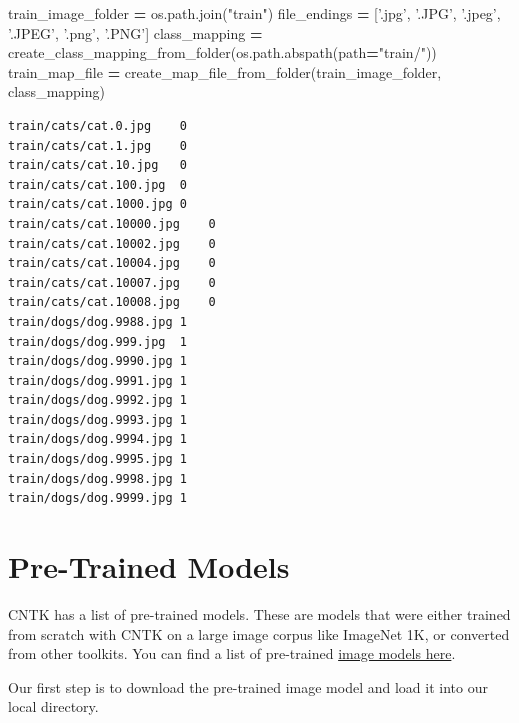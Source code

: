 \documentclass[]{book}
\newenvironment{Shaded}{\begin{snugshade}}{\end{snugshade}}
\newcommand{\StringTok}[1]{\textcolor[rgb]{0.31,0.60,0.02}{#1}}
\newcommand{\FunctionTok}[1]{\textcolor[rgb]{0.00,0.00,0.00}{#1}}
\newcommand{\OperatorTok}[1]{\textcolor[rgb]{0.81,0.36,0.00}{\textbf{#1}}}
\newcommand{\ExtensionTok}[1]{#1}
\newcommand{\NormalTok}[1]{#1}
\theoremstyle{definition}
\theoremstyle{definition}
\theoremstyle{definition}
\theoremstyle{remark}
\begin{document}
\begin{Shaded}
\begin{Highlighting}[]
\NormalTok{train_image_folder }\OperatorTok{=}\NormalTok{ os.path.join(}\StringTok{"train"}\NormalTok{)}
\NormalTok{file_endings }\OperatorTok{=}\NormalTok{ [}\StringTok{'.jpg'}\NormalTok{, }\StringTok{'.JPG'}\NormalTok{, }\StringTok{'.jpeg'}\NormalTok{, }\StringTok{'.JPEG'}\NormalTok{, }\StringTok{'.png'}\NormalTok{, }\StringTok{'.PNG'}\NormalTok{]}
\NormalTok{class_mapping }\OperatorTok{=}\NormalTok{ create_class_mapping_from_folder(os.path.abspath(path}\OperatorTok{=}\StringTok{"train/"}\NormalTok{))}
\NormalTok{train_map_file }\OperatorTok{=}\NormalTok{ create_map_file_from_folder(train_image_folder, class_mapping)}
\end{Highlighting}
\end{Shaded}

\begin{Shaded}
\end{Shaded}

\begin{verbatim}
train/cats/cat.0.jpg    0
train/cats/cat.1.jpg    0
train/cats/cat.10.jpg   0
train/cats/cat.100.jpg  0
train/cats/cat.1000.jpg 0
train/cats/cat.10000.jpg    0
train/cats/cat.10002.jpg    0
train/cats/cat.10004.jpg    0
train/cats/cat.10007.jpg    0
train/cats/cat.10008.jpg    0
train/dogs/dog.9988.jpg 1
train/dogs/dog.999.jpg  1
train/dogs/dog.9990.jpg 1
train/dogs/dog.9991.jpg 1
train/dogs/dog.9992.jpg 1
train/dogs/dog.9993.jpg 1
train/dogs/dog.9994.jpg 1
train/dogs/dog.9995.jpg 1
train/dogs/dog.9998.jpg 1
train/dogs/dog.9999.jpg 1
\end{verbatim}

\section{Pre-Trained Models}\label{pre-trained-models}

CNTK has a list of pre-trained models. These are models that were either
trained from scratch with CNTK on a large image corpus like ImageNet 1K,
or converted from other toolkits. You can find a list of pre-trained
\href{https://github.com/Microsoft/CNTK/blob/master/PretrainedModels/Image.md}{image
models here}.

Our first step is to download the pre-trained image model and load it
into our local directory.
\end{document}
